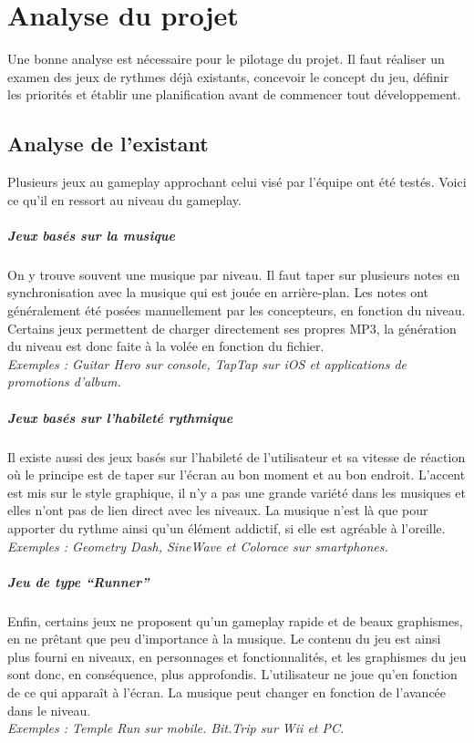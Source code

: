 \chapter{Analyse du projet} %

Une bonne analyse est nécessaire pour le pilotage du projet. Il faut réaliser un examen des jeux de rythmes déjà existants, concevoir le concept du jeu, définir les priorités et établir une planification avant de commencer tout développement.

\section{Analyse de l'existant}

Plusieurs jeux au gameplay approchant celui visé par l’équipe ont été testés. Voici ce qu’il en ressort au niveau du gameplay.
\paragraph{Jeux basés sur la musique}
On y trouve souvent une musique par niveau. Il faut taper sur plusieurs notes en synchronisation avec la musique qui est jouée en arrière-plan. Les notes ont généralement été posées manuellement par les concepteurs, en fonction du niveau. Certains jeux permettent de charger directement ses propres MP3, la génération du niveau est donc faite à la volée en fonction du fichier.\\
\textit{Exemples : Guitar Hero sur console, TapTap sur iOS et applications de promotions d’album.}
\paragraph{Jeux basés sur l’habileté rythmique}
Il existe aussi des jeux basés sur l’habileté de l’utilisateur et sa vitesse de réaction où le principe est de taper sur l’écran au bon moment et au bon endroit. L'accent est mis sur le style graphique, il n'y a pas une grande variété dans les musiques et elles n'ont pas de lien direct avec les niveaux. La musique n'est là que pour apporter du rythme ainsi qu’un élément addictif, si elle est agréable à l’oreille.\\
\textit{Exemples : Geometry Dash, SineWave et Colorace sur smartphones.}
\paragraph{Jeu de type “Runner”}
Enfin, certains jeux ne proposent qu’un gameplay rapide et de beaux graphismes, en ne prêtant que peu d’importance à la musique. Le contenu du jeu est ainsi plus fourni en niveaux, en personnages et fonctionnalités, et les graphismes du jeu sont donc, en conséquence, plus approfondis. L’utilisateur ne joue qu’en fonction de ce qui apparaît à l’écran. La musique peut changer en fonction de l’avancée dans le niveau.\\
\textit{Exemples : Temple Run sur mobile. Bit.Trip sur Wii et PC.}

